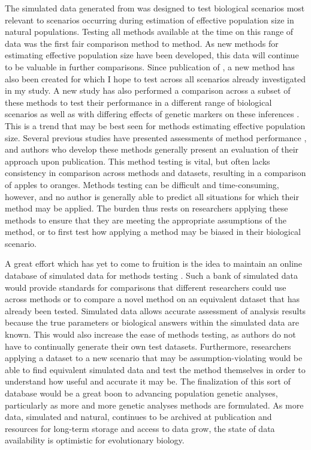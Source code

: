 The simulated data generated from  was designed to test biological scenarios most relevant to scenarios occurring during estimation of effective population size in natural populations. Testing all methods available at the time on this range of data was the first fair comparison method to method. As new methods for estimating effective population size have been developed, this data will continue to be valuable in further comparisons. Since publication of , a new method \citep{Hui:2015} has also been created for which I hope to test across all scenarios already investigated in my study. A new study has also performed a comparison across a subset of these methods to test their performance in a different range of biological scenarios as well as with differing effects of genetic markers on these inferences \citep{Wang:2016}. This is a trend that may be best seen for methods estimating effective population size. Several previous studies have presented assessments of method performance \citep{Ryman:2013, Neel:2013, Holleley:2013, Hoehn:2012, Barker:2011}, and authors who develop these methods generally present an evaluation of their approach upon publication. This method testing is vital, but often lacks consistency in comparison across methods and datasets, resulting in a comparison of apples to oranges. Methods testing can be difficult and time-consuming, however, and no author is generally able to predict all situations for which their method may be applied. The burden thus rests on researchers applying these methods to ensure that they are meeting the appropriate assumptions of the method, or to first test how applying a method may be biased in their biological scenario.

A great effort which has yet to come to fruition is the idea to maintain an online database of simulated data for methods testing %
. Such a bank of simulated data would provide standards for comparisons that different researchers could use across methods or to compare a novel method on an equivalent dataset that has already been tested. Simulated data allows accurate assessment of analysis results because the true parameters or biological answers within the simulated data are known. This would also increase the ease of methods testing, as authors do not have to continually generate their own test datasets. Furthermore, researchers applying a dataset to a new scenario that may be assumption-violating would be able to find equivalent simulated data and test the method themselves in order to understand how useful and accurate it may be. The finalization of this sort of database would be a great boon to advancing population genetic analyses, particularly as more and more genetic analyses methods are formulated. As more data, simulated and natural, continues to be archived at publication and resources for long-term storage and access to data grow, the state of data availability is optimistic for evolutionary biology.

